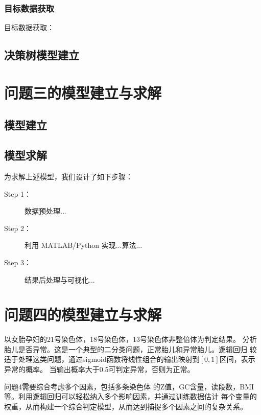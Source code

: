 \documentclass[withoutpreface,notoc]{cumcmthesis}
\begin{document}
	\subsubsection{目标数据获取}


	目标数据获取：


	\subsection{决策树模型建立}




	\section{问题三的模型建立与求解}

	\subsection{模型建立}
	\subsection{模型求解}
	为求解上述模型，我们设计了如下步骤：
	
	\begin{description}
		\item[Step 1：] 数据预处理...
		\item[Step 2：] 利用 MATLAB/Python 实现...算法...
		\item[Step 3：] 结果后处理与可视化...
	\end{description}


















	\section{问题四的模型建立与求解}

	以女胎孕妇的21号染色体，18号染色体，13号染色体非整倍体为判定结果。
	分析胎儿是否异常。这是一个典型的二分类问题，正常胎儿和异常胎儿。逻辑回归
	较适于处理这类问题，通过sigmoid函数将线性组合的输出映射到$[0,1]$区间，表示异常的概率。
	当输出概率大于0.5可判定异常，否则为正常。
	
	问题4需要综合考虑多个因素，包括多条染色体
	的Z值，GC含量，读段数，BMI等。利用逻辑回归可以轻松纳入多个影响因素，并通过训练数据估计
	每个变量的权重，从而构建一个综合判定模型，从而达到捕捉多个因素之间的复杂关系。
\end{document}
